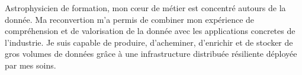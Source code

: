 

\begin{cvparagraph}

Astrophysicien de formation, mon c\oe ur de métier est concentré autours de la donnée. Ma reconvertion m'a permis de combiner mon expérience de compréhension et de valorisation de la donnée avec les applications concretes de l'industrie. Je suis capable de produire, d'acheminer, d'enrichir et de stocker de gros volumes de données grâce à une infrastructure distribuée résiliente déployée par mes soins.
\end{cvparagraph}
